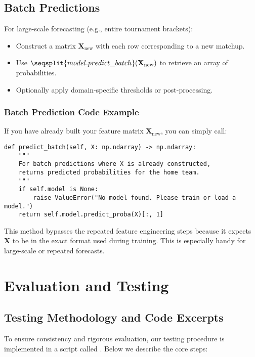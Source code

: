 \documentclass[12pt]{article}
\begin{document}
\subsection{Batch Predictions}
For large-scale forecasting (e.g., entire tournament brackets):
\begin{itemize}[noitemsep]
    \item Construct a matrix \(\mathbf{X}_{\text{new}}\) with each row corresponding to a new matchup.
    \item Use \(\seqsplit{model.predict\_batch}(\mathbf{X}_{\text{new}})\) to retrieve an array of probabilities.
    \item Optionally apply domain-specific thresholds or post-processing.
\end{itemize}

\subsubsection{Batch Prediction Code Example}
If you have already built your feature matrix \(\mathbf{X}_{\text{new}}\), you can simply call:

\begin{verbatim}
def predict_batch(self, X: np.ndarray) -> np.ndarray:
    """
    For batch predictions where X is already constructed,
    returns predicted probabilities for the home team.
    """
    if self.model is None:
        raise ValueError("No model found. Please train or load a model.")
    return self.model.predict_proba(X)[:, 1]
\end{verbatim}

\noindent
This method bypasses the repeated feature engineering steps because it expects \(\mathbf{X}\) to be in the exact format used during training. This is especially handy for large-scale or repeated forecasts.
\section{Evaluation and Testing}
\label{sec:evaluation_testing}
\subsection{Testing Methodology and Code Excerpts}
To ensure consistency and rigorous evaluation, our testing procedure is implemented in a script called . Below we describe the core steps:
\end{document}
